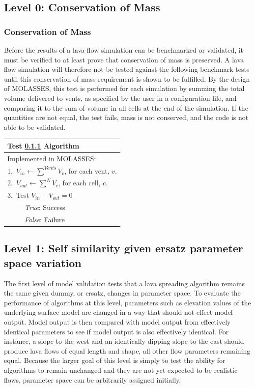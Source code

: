 \documentclass[12pt,letter]{article}
\newcommand{\tabitem}{~~\llap{\textbullet}~~}
\newcommand{\tabitem}{~~\llap{\textbullet}~~}
\begin{document}
	\subsection{Level 0: Conservation of Mass}
		\subsubsection{Conservation of Mass}\label{test:CoM}
			Before the results of a lava flow simulation can be benchmarked or validated, it must be verified to at least prove that conservation of mass is preserved. A lava flow simulation will therefore not be tested against the following benchmark tests until this conservation of mass requirement is shown to be fulfilled. By the design of MOLASSES, this test is performed for each simulation by summing the total volume delivered to vents, as specified by the user in a configuration file, and comparing it to the sum of volume in all cells at the end of the simulation. If the quantities are not equal, the test fails, mass is not conserved, and the code is not able to be validated.
	
			\begin{center}
				\begin{tabular}{l}
					\toprule
					\textbf{Test \ref{test:CoM} Algorithm}\\
					\midrule
					Implemented in MOLASSES:\\
					1.~$V_{in}\leftarrow \displaystyle\sum^{Vents} V_{v}$, for each vent, $v$.\\
					2.~$V_{out}\leftarrow \displaystyle\sum^N V_{c}$, for each cell, $c$.\\
					3.~Test $V_{in}-V_{out}=0$\\
					~\tabitem \textit{True}: Success\\
					~\tabitem \textit{False}: Failure\\
					\bottomrule
				\end{tabular}
			\end{center}

	\subsection{Level 1: Self similarity given ersatz parameter space variation}
		The first level of model validation tests that a lava spreading algorithm remains the same given dummy, or ersatz, changes in parameter space. To evaluate the performance of algorithms at this level, parameters such as elevation values of the underlying surface model are changed in a way that should not effect model output. Model output is then compared with model output from effectively identical parameters to see if model output is also effectively identical. For instance, a slope to the west and an identically dipping slope to the east should produce lava flows of equal length and shape, all other flow parameters remaining equal. Because the larger goal of this level is simply to test the ability for algorithms to remain unchanged and they are not yet expected to be realistic flows, parameter space can be arbitrarily assigned initially.
		
\end{document}
